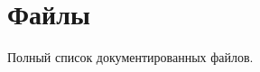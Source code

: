 \section{Файлы}
Полный список документированных файлов.\begin{DoxyCompactList}
\item{}
\end{DoxyCompactList}
